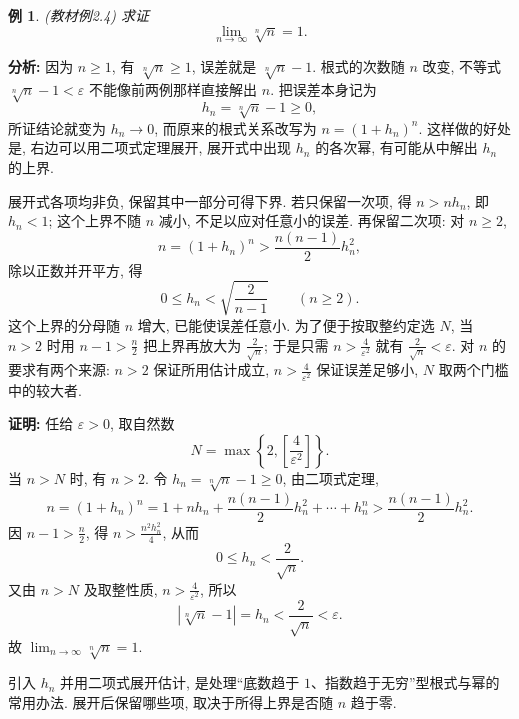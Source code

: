 \documentclass[UTF8,openany]{ctexbook}
\theoremstyle{chinesetextbook}
\newtheorem{example}{例}[section]
\newenvironment{cnproof}{\par\indent\textbf{证明:} \ignorespaces}{\par}
\begin{document}
\begin{example}
\textnormal{(教材例2.4)} 求证
\[
\lim_{n\to\infty}\sqrt[n]{n}=1.
\]
\end{example}

\par\indent\textbf{分析:} 因为 $n\ge1$, 有 $\sqrt[n]n\ge1$, 误差就是 $\sqrt[n]n-1$. 根式的次数随 $n$ 改变, 不等式 $\sqrt[n]n-1<\varepsilon$ 不能像前两例那样直接解出 $n$. 把误差本身记为
\[
h_n=\sqrt[n]n-1\ge0,
\]
所证结论就变为 $h_n\to0$, 而原来的根式关系改写为 $n=(1+h_n)^n$. 这样做的好处是, 右边可以用二项式定理展开, 展开式中出现 $h_n$ 的各次幂, 有可能从中解出 $h_n$ 的上界.

展开式各项均非负, 保留其中一部分可得下界. 若只保留一次项, 得 $n>nh_n$, 即 $h_n<1$; 这个上界不随 $n$ 减小, 不足以应对任意小的误差. 再保留二次项: 对 $n\ge2$,
\[
n=(1+h_n)^n>\frac{n(n-1)}2h_n^2,
\]
除以正数并开平方, 得
\[
0\le h_n<\sqrt{\frac2{n-1}}\qquad(n\ge2).
\]
这个上界的分母随 $n$ 增大, 已能使误差任意小. 为了便于按取整约定选 $N$, 当 $n>2$ 时用 $\displaystyle n-1>\frac n2$ 把上界再放大为 $\displaystyle\frac2{\sqrt n}$; 于是只需 $\displaystyle n>\frac4{\varepsilon^2}$ 就有 $\displaystyle\frac2{\sqrt n}<\varepsilon$. 对 $n$ 的要求有两个来源: $n>2$ 保证所用估计成立, $\displaystyle n>\frac4{\varepsilon^2}$ 保证误差足够小, $N$ 取两个门槛中的较大者.

\begin{cnproof}
任给 $\varepsilon>0$, 取自然数
\[
N=\max\left\{2,\left[\frac4{\varepsilon^2}\right]\right\}.
\]
当 $n>N$ 时, 有 $n>2$. 令 $h_n=\sqrt[n]n-1\ge0$, 由二项式定理,
\[
n=(1+h_n)^n
=1+nh_n+\frac{n(n-1)}2h_n^2+\cdots+h_n^n
>\frac{n(n-1)}2h_n^2.
\]
因 $\displaystyle n-1>\frac n2$, 得 $\displaystyle n>\frac{n^2h_n^2}4$, 从而
\[
0\le h_n<\frac2{\sqrt n}.
\]
又由 $n>N$ 及取整性质, $\displaystyle n>\frac4{\varepsilon^2}$, 所以
\[
\left|\sqrt[n]n-1\right|
=h_n<\frac2{\sqrt n}<\varepsilon.
\]
故 $\displaystyle \lim_{n\to\infty}\sqrt[n]{n}=1$.
\end{cnproof}

引入 $h_n$ 并用二项式展开估计, 是处理“底数趋于 $1$、指数趋于无穷”型根式与幂的常用办法. 展开后保留哪些项, 取决于所得上界是否随 $n$ 趋于零.
\end{document}
